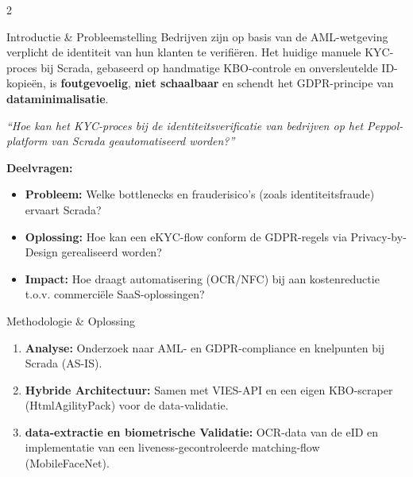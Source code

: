 \documentclass[a0,portrait]{hogent-poster}
\begin{document}
\begin{multicols}{2}
\large

\begin{posterbox}{\faInfoCircle \quad Introductie \& Probleemstelling}
Bedrijven zijn op basis van de AML-wetgeving verplicht de identiteit van hun klanten te verifiëren. 
Het huidige manuele KYC-proces bij Scrada, gebaseerd op handmatige KBO-controle en onversleutelde ID-kopieën, is \textbf{foutgevoelig}, \textbf{niet schaalbaar} en schendt het GDPR-principe van \textbf{dataminimalisatie}.

\vspace{0.4cm}
\begin{tcolorbox}[colback=boxblue!70,colframe=hogent-blue,arc=3mm,boxrule=0.6mm,center,width=0.95\linewidth]
    \centering
    \itshape\Large ``Hoe kan het KYC-proces bij de identiteitsverificatie van bedrijven op het Peppol-platform van Scrada geautomatiseerd worden?''
\end{tcolorbox}

\vspace{0.4cm}
\textbf{Deelvragen:}
\begin{itemize}
    \item \textbf{Probleem:} Welke bottlenecks en frauderisico's (zoals identiteitsfraude) ervaart Scrada?
    \item \textbf{Oplossing:} Hoe kan een eKYC-flow conform de GDPR-regels via Privacy-by-Design gerealiseerd worden?
    \item \textbf{Impact:} Hoe draagt automatisering (OCR/NFC) bij aan kostenreductie t.o.v. commerciële SaaS-oplossingen?
\end{itemize}
\end{posterbox}

\begin{posterbox}{\faFlask \quad Methodologie \& Oplossing}
\begin{enumerate}
    \item \textbf{Analyse:} Onderzoek naar AML- en GDPR-compliance en knelpunten bij Scrada (AS-IS).
    \item \textbf{Hybride Architectuur:} Samen met VIES-API en een eigen KBO-scraper (HtmlAgilityPack) voor de data-validatie.
    \item \textbf{data-extractie en biometrische Validatie:} OCR-data van de eID en implementatie van een liveness-gecontroleerde matching-flow (MobileFaceNet).
\end{enumerate}
\end{posterbox}


\end{multicols}
\end{document}
